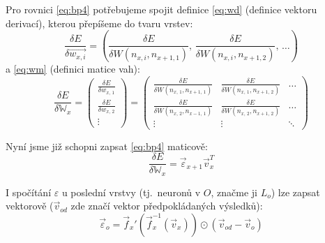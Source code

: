 \documentclass[12pt]{report}			%
\newcommand{\W}{\mathbb{W}}
\begin{document}
					Pro rovnici \ref{eq:bp4} potřebujeme spojit definice \ref{eq:wd} (definice vektoru derivací), kterou přepíšeme do tvaru vrstev:
					\begin{equation} \frac{\delta E}{\delta\vec{w_{x,i}}} = \left(\frac{\delta E}{\delta W\left(n_{x, i}, n_{x+1,1}\right)},\,\frac{\delta E}{\delta W\left(n_{x, i}, n_{x+1,2}\right)},\,\ldots\right) \end{equation}
					a \ref{eq:wm} (definici matice vah):
					\begin{equation}
						\frac{\delta E}{\delta \W_x} = \begin{pmatrix}
							\frac{\delta E}{\delta w_{x,\,1}} \\
							\frac{\delta E}{\delta w_{x,\,2}} \\
							\vdots
						\end{pmatrix} = \begin{pmatrix}
							\frac{\delta E}{\delta W\left(n_{x,\,1}, n_{x+1,\,1}\right)} & \frac{\delta E}{\delta W\left(n_{x,\,1}, n_{x+1,\,2}\right)} & \ldots \\
							\frac{\delta E}{\delta W\left(n_{x,\,2}, n_{x-1,\,1}\right)} & \frac{\delta E}{\delta W\left(n_{x,\,2}, n_{x+1,\,2}\right)} & \ldots \\
							\vdots & \vdots & \ddots
						\end{pmatrix}
						\label{eq:wdm}
					\end{equation}
					
					Nyní jsme již schopni zapsat \ref{eq:bp4} maticově:
					\begin{equation} \frac{\delta E}{\delta \W_x} = \vec{\varepsilon}_{x+1} \vec{v}_x^T \label{eq:bpab2} \end{equation}

 					I spočítání $\varepsilon$ u poslední vrstvy (tj.~neuronů v $O$, značme ji $L_o$) lze zapsat vektorově ($\vec{v}_{od}$ zde značí vektor předpokládaných výsledků):
					\begin{equation} \vec{\varepsilon}_o = \vec{f}_x'\left(\vec{f}_x^{-1}(\vec{v}_x)\right) \odot \left(\vec{v}_{od} - \vec{v}_o\right) \label{eq:bpab3} \end{equation}
					
\end{document}
